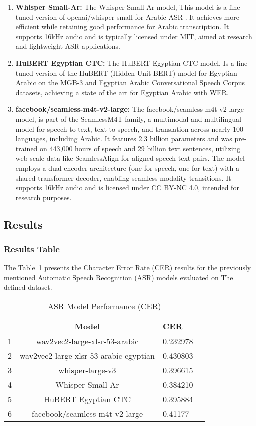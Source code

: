 \documentclass[12pt]{article}
\begin{document}
\begin{enumerate}
    \item \textbf{Whisper Small-Ar:} The Whisper Small-Ar model, This model is a fine-tuned version of openai/whisper-small for Arabic ASR . It achieves  more efficient while retaining good performance for Arabic transcription. It supports 16kHz audio and is typically licensed under MIT, aimed at research and lightweight ASR applications.

    \item \textbf{HuBERT Egyptian CTC:} The HuBERT Egyptian CTC model, Is a fine-tuned version of the HuBERT (Hidden-Unit BERT) model for Egyptian Arabic on the MGB-3 and Egyptian Arabic Conversational Speech Corpus datasets, achieving a state of the art for Egyptian Arabic with WER.

    \item \textbf{facebook/seamless-m4t-v2-large:} The facebook/seamless-m4t-v2-large model, is part of the SeamlessM4T family, a multimodal and multilingual model for speech-to-text, text-to-speech, and translation across nearly 100 languages, including Arabic. It features 2.3 billion parameters and was pre-trained on 443,000 hours of speech and 29 billion text sentences, utilizing web-scale data like SeamlessAlign for aligned speech-text pairs. The model employs a dual-encoder architecture (one for speech, one for text) with a shared transformer decoder, enabling seamless modality transitions. It supports 16kHz audio and is licensed under CC BY-NC 4.0, intended for research purposes.
\end{enumerate}



\subsection{Results}

\subsubsection{Results Table}
The Table~\ref{tab:res} presents the Character Error Rate (CER) results for the previously mentioned Automatic Speech Recognition (ASR) models evaluated on The defined dataset.

\begin{table}[h]
    \centering
    \caption{ASR Model Performance (CER)}
    \begin{tabular}{lclc}
        \toprule
          & \textbf{Model} & \textbf{CER} \\
        \midrule
        1& wav2vec2-large-xlsr-53-arabic & 0.232978 \\
        2& wav2vec2-large-xlsr-53-arabic-egyptian & 0.430803 \\
        3& whisper-large-v3 & 0.396615 \\
        4& Whisper Small-Ar & 0.384210 \\
        5& HuBERT Egyptian CTC & 0.395884 \\
        6& facebook/seamless-m4t-v2-large & 0.41177 \\
        \bottomrule
    \end{tabular}
    \label{tab:res}
\end{table}
\end{document}
